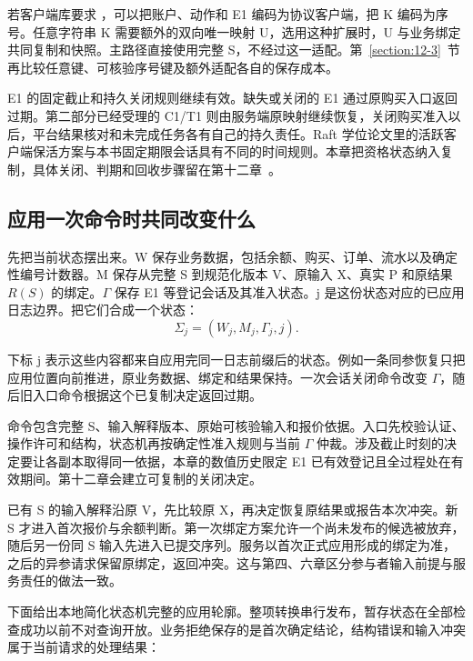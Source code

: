 若客户端库要求 ，可以把账户、动作和 E1 编码为协议客户端，把 K 编码为序号。任意字符串 K 需要额外的双向唯一映射 U，选用这种扩展时，U 与业务绑定共同复制和快照。主路径直接使用完整 S，不经过这一适配。第~\ref{section:12-3}~节再比较任意键、可核验序号键及额外适配各自的保存成本。

E1 的固定截止和持久关闭规则继续有效。缺失或关闭的 E1 通过原购买入口返回过期。第二部分已经受理的 C1/T1 则由服务端原映射继续恢复，关闭购买准入以后，平台结果核对和未完成任务各有自己的持久责任。Raft 学位论文里的活跃客户端保活方案与本书固定期限会话具有不同的时间规则。本章把资格状态纳入复制，具体关闭、判期和回收步骤留在第十二章~\cite{ongaro}。

\subsection*{应用一次命令时共同改变什么}

先把当前状态摆出来。W 保存业务数据，包括余额、购买、订单、流水以及确定性编号计数器。M 保存从完整 S 到规范化版本 V、原输入 X、真实 P 和原结果 $R(S)$ 的绑定。$\Gamma$ 保存 E1 等登记会话及其准入状态。j 是这份状态对应的已应用日志边界。把它们合成一个状态：
\[
  \Sigma_j=(W_j,M_j,\Gamma_j,j).
\]

下标 j 表示这些内容都来自应用完同一日志前缀后的状态。例如一条同参恢复只把应用位置向前推进，原业务数据、绑定和结果保持。一次会话关闭命令改变 $\Gamma$，随后旧入口命令根据这个已复制决定返回过期。


命令包含完整 S、输入解释版本、原始可核验输入和报价依据。入口先校验认证、操作许可和结构，状态机再按确定性准入规则与当前 $\Gamma$ 仲裁。涉及截止时刻的决定要让各副本取得同一依据，本章的数值历史限定 E1 已有效登记且全过程处在有效期间。第十二章会建立可复制的关闭决定。

已有 S 的输入解释沿原 V，先比较原 X，再决定恢复原结果或报告本次冲突。新 S 才进入首次报价与余额判断。第一次绑定方案允许一个尚未发布的候选被放弃，随后另一份同 S 输入先进入已提交序列。服务以首次正式应用形成的绑定为准，之后的异参请求保留原绑定，返回冲突。这与第四、六章区分参与者输入前提与服务责任的做法一致。


下面给出本地简化状态机完整的应用轮廓。整项转换串行发布，暂存状态在全部检查成功以前不对查询开放。业务拒绝保存的是首次确定结论，结构错误和输入冲突属于当前请求的处理结果：

